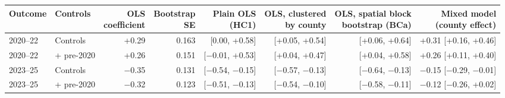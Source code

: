 \footnotesize\setlength{\tabcolsep}{1.8pt}
\begin{tabular}{llrrrrrr}
\toprule
Outcome & Controls & \shortstack[r]{OLS\\coefficient} & \shortstack[r]{Bootstrap\\SE} & \shortstack[r]{Plain OLS\\(HC1)} & \shortstack[r]{OLS, clustered\\by county} & \shortstack[r]{OLS, spatial block\\bootstrap (BCa)} & \shortstack[r]{Mixed model\\(county effect)} \\
\midrule
2020--22 & Controls & +0.29 & 0.163 & [0.00, +0.58] & [+0.05, +0.54] & [+0.06, +0.64] & +0.31 [+0.16, +0.46] \\
2020--22 & + pre-2020 & +0.26 & 0.151 & [$-$0.01, +0.53] & [+0.04, +0.47] & [+0.04, +0.58] & +0.26 [+0.11, +0.40] \\
2023--25 & Controls & $-$0.35 & 0.131 & [$-$0.54, $-$0.15] & [$-$0.57, $-$0.13] & [$-$0.64, $-$0.13] & $-$0.15 [$-$0.29, $-$0.01] \\
2023--25 & + pre-2020 & $-$0.32 & 0.123 & [$-$0.51, $-$0.13] & [$-$0.54, $-$0.10] & [$-$0.58, $-$0.11] & $-$0.12 [$-$0.26, +0.02] \\
\bottomrule
\end{tabular}
